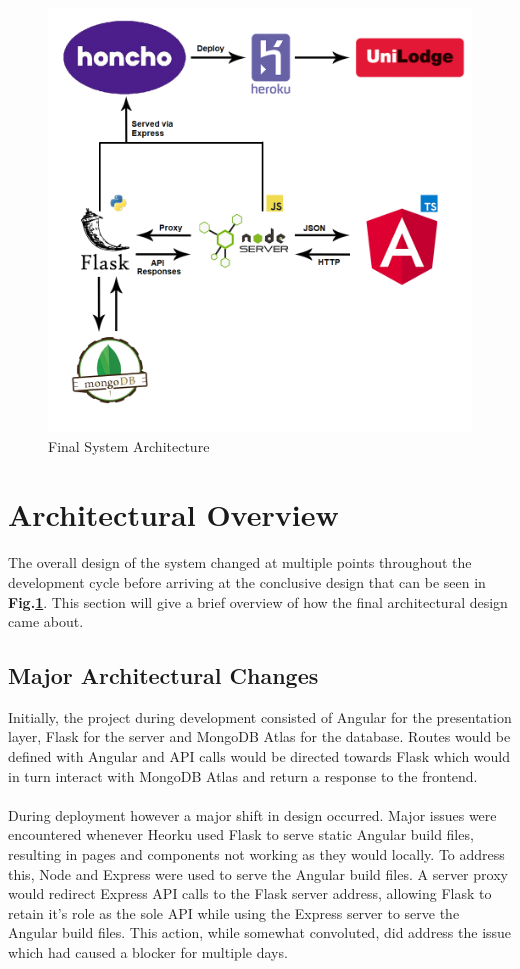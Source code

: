\begin{figure}[H]
	\caption{Final System Architecture}
	\label{image:design}
	\centering
	\includegraphics[width=1\textwidth]{images/design.png}
\end{figure}	

\section{Architectural Overview}
The overall design of the system changed at multiple points throughout the development cycle before arriving at the conclusive design that can be seen in \textbf{Fig.\ref{image:design}}. This section will give a brief overview of how the final architectural design came about.

\subsection{Major Architectural Changes}
Initially, the project during development consisted of Angular for the presentation layer, Flask for the server and MongoDB Atlas for the database. Routes would be defined with Angular and API calls would be directed towards Flask which would in turn interact with MongoDB Atlas and return a response to the frontend.

\paragraph{}
During deployment however a major shift in design occurred. Major issues were encountered whenever Heorku used Flask to serve static Angular build files, resulting in pages and components not working as they would locally. To address this, Node and Express were used to serve the Angular build files. A server proxy would redirect Express API calls to the Flask server address, allowing Flask to retain it's role as the sole API while using the Express server to serve the Angular build files. This action, while somewhat convoluted, did address the issue which had caused a blocker for multiple days.

